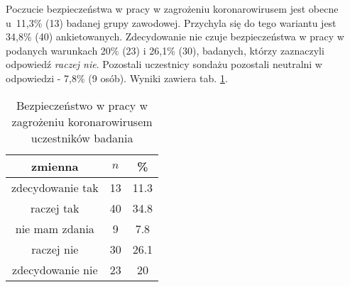 

Poczucie bezpieczeństwa w pracy w zagrożeniu koronarowirusem jest obecne u~11,3\% (13) badanej grupy zawodowej. Przychyla się do tego wariantu jest 34,8\% (40) ankietowanych.  Zdecydowanie nie czuje bezpieczeństwa w pracy w podanych warunkach 20\% (23) i 26,1\% (30), badanych, którzy zaznaczyli odpowiedź \textit{raczej nie}. Pozostali uczestnicy sondażu pozostali neutralni w odpowiedzi - 7,8\% (9 osób). Wyniki zawiera tab. \ref{tab:Q18}.

\begin{table}[H]
\caption{Bezpieczeństwo w pracy w zagrożeniu koronarowirusem uczestników badania}
\centering
\begin{tabular}{ | c | c | c |}
\hline
zmienna & $n$ & \% \\
\hline
zdecydowanie tak  &  13  & 11.3\\
\hline
raczej tak  &  40  & 34.8\\
\hline
nie mam zdania  &  9  & 7.8 \\
\hline
raczej nie  &  30  & 26.1 \\
\hline
zdecydowanie nie  &  23  & 20 \\
\hline
\end{tabular}
\label{tab:Q18}
\end{table}
